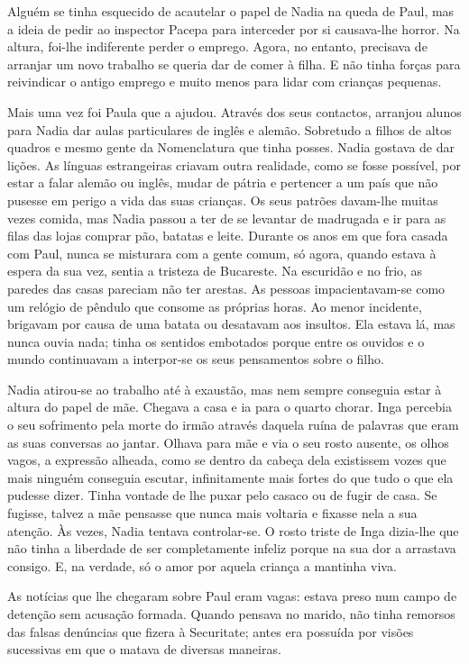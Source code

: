 Alguém se tinha esquecido de acautelar o papel de Nadia na queda de
Paul, mas a ideia de pedir ao inspector Pacepa para interceder por si
causava-lhe horror. Na altura, foi-lhe indiferente perder o emprego.
Agora, no entanto, precisava de arranjar um novo trabalho se queria dar
de comer à filha. E não tinha forças para reivindicar o antigo emprego e
muito menos para lidar com crianças pequenas.

Mais uma vez foi Paula que a ajudou. Através dos seus contactos,
arranjou alunos para Nadia dar aulas particulares de inglês e alemão.
Sobretudo a filhos de altos quadros e mesmo gente da Nomenclatura que
tinha posses. Nadia gostava de dar lições. As línguas estrangeiras criavam outra realidade, como se fosse possível, por estar a falar alemão ou
inglês, mudar de pátria e pertencer a um país que não pusesse em perigo
a vida das suas crianças. Os seus patrões davam-lhe muitas vezes comida,
mas Nadia passou a ter de se levantar de madrugada e ir para as filas
das lojas comprar pão, batatas e leite. Durante os anos em que fora
casada com Paul, nunca se misturara com a gente comum, só agora, quando
estava à espera da
sua vez, sentia a tristeza de Bucareste. Na escuridão e no frio, as
paredes das casas pareciam não ter arestas. As pessoas
impacientavam-se como um relógio de pêndulo que consome as próprias
horas. Ao menor incidente, brigavam por causa de uma batata ou desatavam
aos insultos. Ela estava lá, mas nunca ouvia nada; tinha os sentidos
embotados porque entre os ouvidos e o mundo continuavam a interpor-se
os seus pensamentos sobre o filho.

Nadia atirou-se ao trabalho até à exaustão, mas nem sempre conseguia
estar à altura do papel de mãe. Chegava a casa e ia para o quarto
chorar. Inga percebia o seu sofrimento pela morte do irmão através
daquela ruína de palavras que eram as suas conversas ao jantar. Olhava
para mãe e via o seu rosto ausente, os olhos vagos, a expressão alheada,
como se dentro da cabeça dela existissem vozes que mais ninguém
conseguia escutar, infinitamente mais fortes do que tudo o que ela
pudesse dizer. Tinha vontade de lhe puxar pelo casaco ou de fugir de
casa. Se fugisse, talvez a mãe pensasse que nunca mais voltaria e
fixasse nela a sua atenção. Às vezes, Nadia tentava controlar-se. O
rosto triste de Inga dizia-lhe que não tinha a liberdade de ser
completamente infeliz porque na sua dor a arrastava consigo. E, na
verdade, só o amor por aquela criança a mantinha viva.

As notícias que lhe chegaram sobre Paul eram vagas:
estava preso num campo de detenção sem acusação formada. Quando
pensava no marido, não tinha remorsos das falsas denúncias que fizera à
Securitate; antes era possuída por visões sucessivas em que o matava de
diversas maneiras.

